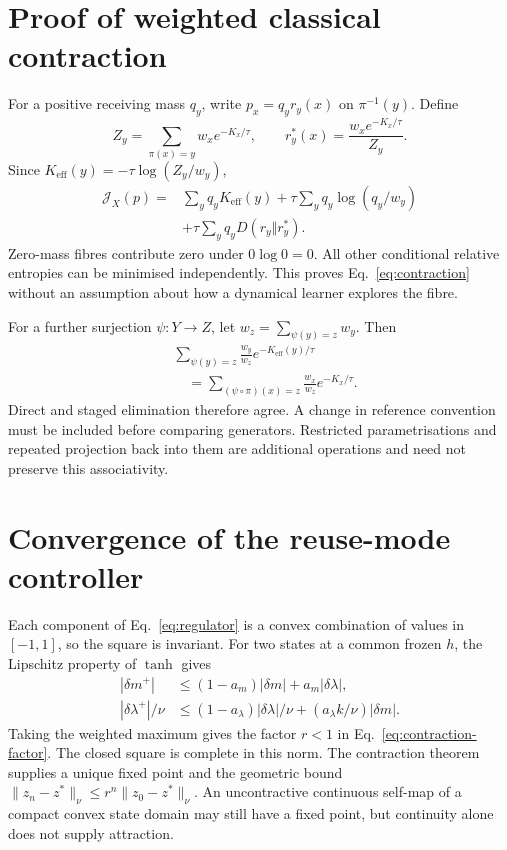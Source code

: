 \section{Proof of weighted classical contraction}
\label{app:classical}

For a positive receiving mass \(q_y\), write
\(p_x=q_yr_y(x)\) on \(\pi^{-1}(y)\). Define
\[
 Z_y=\sum_{\pi(x)=y}w_xe^{-K_x/\tau},
 \qquad r_y^*(x)=\frac{w_xe^{-K_x/\tau}}{Z_y}.
\]
Since \(K_{\mathrm{eff}}(y)=-\tau\log(Z_y/w_y)\),
\begin{align}
 \mathcal J_X(p)
 ={}&\sum_yq_yK_{\mathrm{eff}}(y)
       +\tau\sum_yq_y\log(q_y/w_y)\nonumber\\
    &+\tau\sum_yq_yD(r_y\Vert r_y^*).
 \label{eq:conditional-kl}
\end{align}
Zero-mass fibres contribute zero under \(0\log0=0\). All other conditional relative entropies can be minimised independently. This proves Eq.~\eqref{eq:contraction} without an assumption about how a dynamical learner explores the fibre.

For a further surjection \(\psi:Y\to Z\), let
\(w_z=\sum_{\psi(y)=z}w_y\). Then
\begin{align}
 &\sum_{\psi(y)=z}\frac{w_y}{w_z}e^{-K_{\mathrm{eff}}(y)/\tau}
 \nonumber\\
 &\hspace{1em}=
 \sum_{(\psi\circ\pi)(x)=z}\frac{w_x}{w_z}e^{-K_x/\tau}.
 \label{eq:staged-contraction}
\end{align}
Direct and staged elimination therefore agree. A change in reference convention must be included before comparing generators. Restricted parametrisations and repeated projection back into them are additional operations and need not preserve this associativity.

\section{Convergence of the reuse-mode controller}
\label{app:controller}

Each component of Eq.~\eqref{eq:regulator} is a convex combination of values in \([-1,1]\), so the square is invariant. For two states at a common frozen \(h\), the Lipschitz property of \(\tanh\) gives
\begin{align*}
 |\delta m^+|&\leq(1-a_m)|\delta m|+a_m|\delta\lambda|,\\
 |\delta\lambda^+|/\nu
 &\leq(1-a_\lambda)|\delta\lambda|/\nu
             +(a_\lambda k/\nu)|\delta m|.
\end{align*}
Taking the weighted maximum gives the factor \(r<1\) in Eq.~\eqref{eq:contraction-factor}. The closed square is complete in this norm. The contraction theorem supplies a unique fixed point and the geometric bound
\(\|z_n-z^*\|_\nu\leq r^n\|z_0-z^*\|_\nu\).
An uncontractive continuous self-map of a compact convex state domain may still have a fixed point, but continuity alone does not supply attraction.

